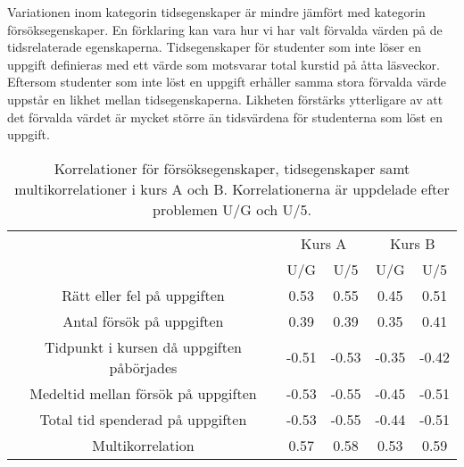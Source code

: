 
Variationen inom kategorin tidsegenskaper är mindre jämfört med kategorin försöksegenskaper. En förklaring kan vara hur vi har valt förvalda värden på de tidsrelaterade egenskaperna. Tidsegenskaper för studenter som inte löser en uppgift definieras med ett värde som motsvarar total kurstid på åtta läsveckor. Eftersom studenter som inte löst en uppgift erhåller samma stora förvalda värde uppstår en likhet mellan tidsegenskaperna. Likheten förstärks ytterligare av att det förvalda värdet är mycket större än tidsvärdena för studenterna som löst en uppgift. 

\begin{table}[hbpt]
    \centering
    \caption{Korrelationer för försöksegenskaper, tidsegenskaper samt multikorrelationer i kurs A och B. Korrelationerna är uppdelade efter problemen U/G och U/5.}
    \label{tab:korr}
    \begin{tabular}{||c||c|c|c|c|}
    \multicolumn{1}{c}{} & \multicolumn{2}{c}{Kurs A} & \multicolumn{2}{c}{Kurs B}\\
    \cline{1-5}
    \multicolumn{1}{||c||}{} & \multicolumn{1}{c|}{U/G} & \multicolumn{1}{c|}{U/5} & \multicolumn{1}{c|}{U/G} & \multicolumn{1}{c|}{U/5} \\
    \hline
    Rätt eller fel på uppgiften                    &  0.53 &  0.55  &  0.45 &  0.51 \\
    Antal försök på uppgiften                      &  0.39 &  0.39  &  0.35 &  0.41 \\
    Tidpunkt i kursen då uppgiften påbörjades      & -0.51 & -0.53  & -0.35 & -0.42 \\
    Medeltid mellan försök på uppgiften            & -0.53 & -0.55  & -0.45 & -0.51 \\
    Total tid spenderad på uppgiften               & -0.53 & -0.55  & -0.44 & -0.51 \\ \hline
    Multikorrelation                               &  0.57 &  0.58  &  0.53 &  0.59 \\
    \hline
    \end{tabular}
\end{table}


